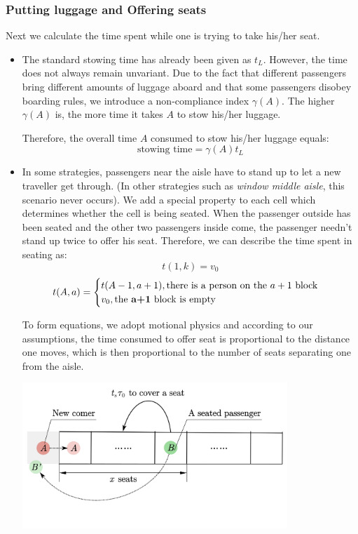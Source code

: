 \documentclass{article}
\begin{document}
	\subsubsection{Putting luggage and Offering seats}
	Next we calculate the time spent while one is trying to take his/her seat.
	\begin{itemize}
		\item {}

		The standard stowing time has already been given as \(t_L\). However, the time does not always remain unvariant. Due to the fact that different passengers bring different amounts of luggage aboard and that some passengers disobey boarding rules, we introduce a non-compliance index \(\gamma\left(A\right)\). The higher \(\gamma\left(A\right)\) is, the more time it takes \(A\) to stow his/her luggage.

		Therefore, the overall time \(A\) consumed to stow his/her luggage equals:
		\[\text{stowing time}=\gamma \left( A \right) t_L \]
		\item {}

		In some strategies, passengers near the aisle have to stand up to let a new traveller get through. (In other strategies such as \textit{window middle aisle}, this scenario never occurs). We add a special property to each cell which determines whether the cell is being seated. When the passenger outside has been seated and the other two passengers inside come, the passenger needn't stand up twice to offer his seat. Therefore, we can describe the time spent in seating as:
		$$t(1,k)=v_0$$
		$$t(A,a)=\begin{cases}t(A-1,a+1),\text{there is a person on the $a+1$ block}\\v_0, \text{the \textbf{a+1} block is empty}\end{cases}$$

		To form equations, we adopt motional physics and according to our assumptions, the time consumed to offer seat is proportional to the distance one moves, which is then proportional to the number of seats separating one from the aisle.
		\begin{center}
		\includegraphics[width = 10cm]{offering a seat.jpg}


\end{center}
\end{itemize}
\end{document}
